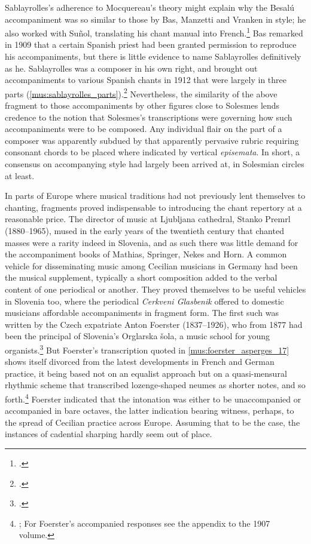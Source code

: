 Sablayrolles's adherence to Mocquereau's theory might explain why the Besalú accompaniment was so similar to those by Bas, Manzetti and Vranken in style; he also worked with Suñol, translating his chant manual into French.\footcite[47]{MassotiMuntanerAproximaciohistoriareligiosa1973}
Bas remarked in 1909 that a certain Spanish priest had been granted permission to reproduce his accompaniments, but there is little evidence to name Sablayrolles definitively as he.
Sablayrolles was a composer in his own right, and brought out accompaniments to various Spanish chants in 1912 that were largely in three parts (\cref{mus:sablayrolles_parts}).\footcite[31]{SablayrollesAlleluiaPsalliteDeo1912}
Nevertheless, the similarity of the above fragment to those accompaniments by other figures close to Solesmes lends credence to the notion that Solesmes's transcriptions were governing how such accompaniments were to be composed.
Any individual flair on the part of a composer was apparently subdued by that apparently pervasive rubric requiring consonant chords to be placed where indicated by vertical \emph{episemata}.
In short, a consensus on accompanying style had largely been arrived at, in Solesmian circles at least.

In parts of Europe where musical traditions had not previously lent themselves to chanting, fragments proved indispensable to introducing the chant repertory at a reasonable price.
The director of music at Ljubljana cathedral, Stanko Premrl (1880--1965), mused in the early years of the twentieth century that chanted masses were a rarity indeed in Slovenia, and as such there was little demand for the accompaniment books of Mathias, Springer, Nekes and Horn.
A common vehicle for disseminating music among Cecilian musicians in Germany had been the musical supplement, typically a short composition added to the verbal content of one periodical or another.
They proved themselves to be useful vehicles in Slovenia too, where the periodical \emph{Cerkveni Glasbenik} offered to domestic musicians affordable accompaniments in fragment form.
The first such was written by the Czech expatriate Anton Foerster (1837--1926), who from 1877 had been the principal of Slovenia's Orglarska šola, a music school for young organists.\footcite[179--80]{SkuljSurveyEvolutionSlovene1995}
But Foerster's transcription quoted in \cref{mus:foerster_asperges_17} shows itself divorced from the latest developments in French and German practice, it being based not on an equalist approach but on a quasi-mensural rhythmic scheme that transcribed lozenge-shaped neumes as shorter notes, and so forth.\footnote{\cite[17]{FoersterAspergesmeTrad1906}; For Foerster's accompanied responses see the appendix to the 1907 volume.}
Foerster indicated that the intonation was either to be unaccompanied or accompanied in bare octaves, the latter indication bearing witness, perhaps, to the spread of Cecilian practice across Europe.
Assuming that to be the case, the instances of cadential sharping hardly seem out of place.

